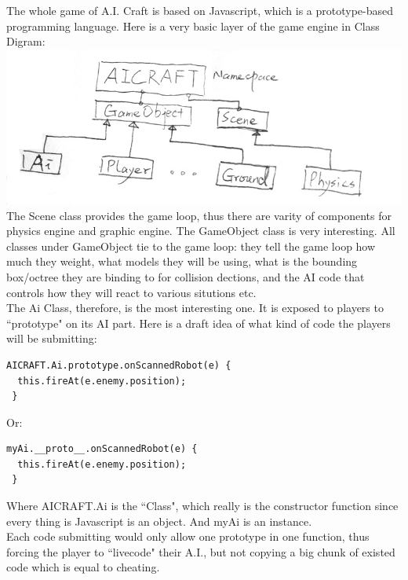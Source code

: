 \documentclass[12pt]{article}
\begin{document}
The whole game of A.I. Craft is based on Javascript, which is a prototype-based programming language. Here is a very basic layer of the game engine in Class Digram:\\

\includegraphics[scale=0.4]{uml.jpg}\\

The Scene class provides the game loop, thus there are varity of components for physics engine and graphic engine. The GameObject class is very interesting. All classes under GameObject tie to the game loop: they tell the game loop how much they weight, what models they will be using, what is the bounding box/octree they are binding to for collision dections, and the AI code that controls how they will react to various situtions etc.\\

The Ai Class, therefore, is the most interesting one. It is exposed to players to ``prototype" on its AI part. Here is a draft idea of what kind of code the players will be submitting:

\begin{verbatim}
AICRAFT.Ai.prototype.onScannedRobot(e) {
  this.fireAt(e.enemy.position);
 }
\end{verbatim}

Or:

\begin{verbatim}
myAi.__proto__.onScannedRobot(e) {
  this.fireAt(e.enemy.position);
 }
\end{verbatim}

Where AICRAFT.Ai is the ``Class", which really is the constructor function since every thing is Javascript is an object. And myAi is an instance.\\

Each code submitting would only allow one prototype in one function, thus forcing the player to ``livecode" their A.I., but not copying a big chunk of existed code which is equal to cheating.\\
\end{document}
